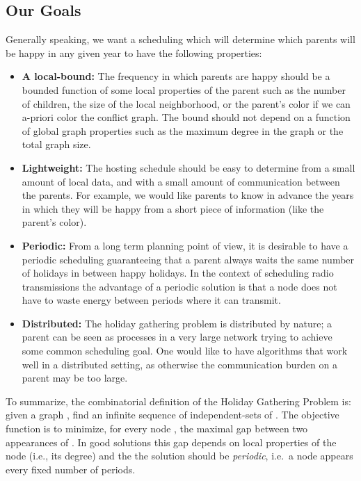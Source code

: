 \documentclass[11pt]{article}
\begin{document}
\subsection{Our Goals}
Generally speaking, we want a scheduling which will determine which
parents will be happy in any given year to have the following
properties:
\begin{itemize}
 \item {\bf A local-bound:} The frequency in which parents are happy
   should be a bounded function of some local properties of the
   parent such as the number of children, the size of the local
   neighborhood, or the parent's color if we can a-priori color the
   conflict graph. The bound should not depend on a function of global
   graph properties such as the maximum degree in the graph or the
   total graph size.

\item {\bf Lightweight:} The hosting schedule should be easy to
  determine from a small amount of local data, and with a small amount
  of communication between the parents. For example, we would like
  parents to know in advance the years in which they will be happy
  from a short piece of information (like the parent's color).

\item {\bf Periodic:} From a long term planning point of view, it is desirable to have a periodic scheduling guaranteeing that a parent always waits the same number of holidays in between happy holidays.
In the context of scheduling radio transmissions the advantage of a periodic solution is that a node does not have to waste energy between periods where it can transmit.

\item {\bf Distributed:} The holiday gathering problem is distributed by nature; a parent can be seen as processes in a very large network trying to achieve some common scheduling goal. One would like to have algorithms that work well in a distributed setting, as otherwise the communication burden on a parent may be too large.

\end{itemize}

To summarize, the combinatorial definition of the Holiday Gathering Problem is: given a graph , find an infinite sequence of independent-sets of . The objective function is to minimize, for every node , the maximal gap between two appearances of .
In good solutions this gap depends on local properties of the node (i.e., its degree) and the the solution should be {\em periodic}, i.e.\ a node appears every fixed number of periods.
\end{document}
